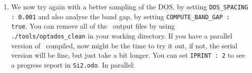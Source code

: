 \documentclass[a4paper,11pt,twoside]{book}
\begin{document}
{\begin{enumerate}
This file can be plotted by your favourite graph-plotting software. However, \optados\ has made things easy and generated a  {\tt Si2.adaptive.agr} file which is directly plottable using \verb#xmgrace# as shown in Fig.\,\ref{fig:Si2_adaptive1}.

\verb#$ xmgrace Si2.adaptive.agr#.

\begin{figure}[h]
\begin{center}
\caption{Density of States of Silicon generated by adaptive broadening and a very coarse energy sampling of 0.1 eV.}
\label{fig:Si2_adaptive1} 
\end{center}
\end{figure}

\item We now try again with a better sampling of the DOS, by setting \verb#DOS_SPACING : 0.001# and also analyse the band gap, by setting \verb#COMPUTE_BAND_GAP : true#.  You can remove all of the \optados\ output files by using \verb#./tools/optados_clean# in your working directory.  If you have a parallel version of \optados\ compiled, now might be the time to try it out, if not, the serial version will be fine, but just take a bit longer.  You can set \verb#IPRINT : 2# to see a progress report in  \verb#Si2.odo#.  In parallel:


\end{enumerate}}
\end{document}
